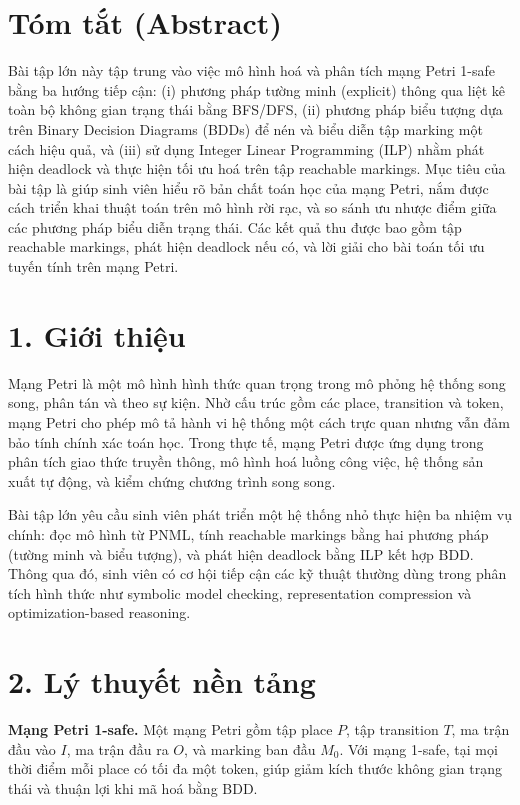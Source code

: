 \documentclass[12pt,a4paper]{article}
\begin{document}
\vfill

\cleardoublepage
\tableofcontents
\cleardoublepage

\fontsize{13}{20}\selectfont

\section*{Tóm tắt (Abstract)}
Bài tập lớn này tập trung vào việc mô hình hoá và phân tích mạng Petri 1-safe bằng ba hướng tiếp cận:
(i) phương pháp tường minh (explicit) thông qua liệt kê toàn bộ không gian trạng thái bằng BFS/DFS,
(ii) phương pháp biểu tượng dựa trên Binary Decision Diagrams (BDDs) để nén và biểu diễn tập marking một cách hiệu quả,
và (iii) sử dụng Integer Linear Programming (ILP) nhằm phát hiện deadlock và thực hiện tối ưu hoá trên tập reachable markings.
Mục tiêu của bài tập là giúp sinh viên hiểu rõ bản chất toán học của mạng Petri, nắm được cách triển khai thuật toán trên mô hình rời rạc,
và so sánh ưu nhược điểm giữa các phương pháp biểu diễn trạng thái.
Các kết quả thu được bao gồm tập reachable markings, phát hiện deadlock nếu có, và lời giải cho bài toán tối ưu tuyến tính trên mạng Petri.

\section*{1. Giới thiệu}
Mạng Petri là một mô hình hình thức quan trọng trong mô phỏng hệ thống song song, phân tán và theo sự kiện.
Nhờ cấu trúc gồm các place, transition và token, mạng Petri cho phép mô tả hành vi hệ thống một cách trực quan nhưng vẫn đảm bảo tính chính xác toán học.
Trong thực tế, mạng Petri được ứng dụng trong phân tích giao thức truyền thông, mô hình hoá luồng công việc, hệ thống sản xuất tự động, và kiểm chứng chương trình song song.

Bài tập lớn yêu cầu sinh viên phát triển một hệ thống nhỏ thực hiện ba nhiệm vụ chính:
đọc mô hình từ PNML, tính reachable markings bằng hai phương pháp (tường minh và biểu tượng), và phát hiện deadlock bằng ILP kết hợp BDD.
Thông qua đó, sinh viên có cơ hội tiếp cận các kỹ thuật thường dùng trong phân tích hình thức như symbolic model checking, representation compression và optimization-based reasoning.

\section*{2. Lý thuyết nền tảng}
\textbf{Mạng Petri 1-safe.}
Một mạng Petri gồm tập place $P$, tập transition $T$, ma trận đầu vào $I$, ma trận đầu ra $O$, và marking ban đầu $M_0$.
Với mạng 1-safe, tại mọi thời điểm mỗi place có tối đa một token, giúp giảm kích thước không gian trạng thái và thuận lợi khi mã hoá bằng BDD.
\end{document}
